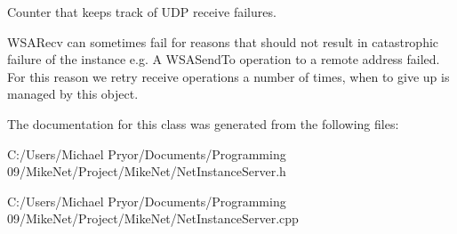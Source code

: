 Counter that keeps track of UDP receive failures. 

WSARecv can sometimes fail for reasons that should not result in catastrophic failure of the instance e.g. A WSASendTo operation to a remote address failed. For this reason we retry receive operations a number of times, when to give up is managed by this object. 

The documentation for this class was generated from the following files:\begin{DoxyCompactItemize}
\item 
C:/Users/Michael Pryor/Documents/Programming 09/MikeNet/Project/MikeNet/NetInstanceServer.h\item 
C:/Users/Michael Pryor/Documents/Programming 09/MikeNet/Project/MikeNet/NetInstanceServer.cpp\end{DoxyCompactItemize}
